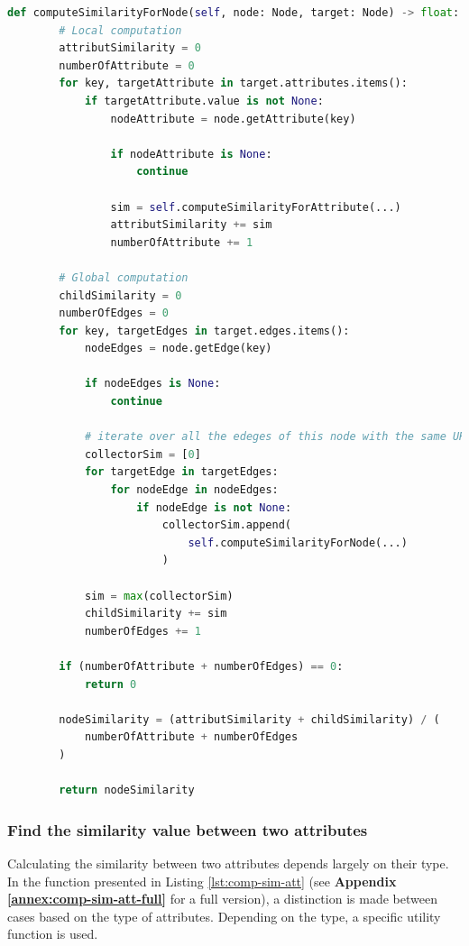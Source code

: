 \begin{lstlisting}[language=Python, caption=Function to find the similarity between one case and all the cases in the data-base, label={lst:comp-sim-node}]
def computeSimilarityForNode(self, node: Node, target: Node) -> float:
        # Local computation
        attributSimilarity = 0
        numberOfAttribute = 0
        for key, targetAttribute in target.attributes.items():
            if targetAttribute.value is not None:
                nodeAttribute = node.getAttribute(key)

                if nodeAttribute is None:
                    continue

                sim = self.computeSimilarityForAttribute(...)
                attributSimilarity += sim
                numberOfAttribute += 1

        # Global computation
        childSimilarity = 0
        numberOfEdges = 0
        for key, targetEdges in target.edges.items():
            nodeEdges = node.getEdge(key)

            if nodeEdges is None:
                continue

            # iterate over all the edeges of this node with the same URI
            collectorSim = [0]
            for targetEdge in targetEdges:
                for nodeEdge in nodeEdges:
                    if nodeEdge is not None:
                        collectorSim.append(
                            self.computeSimilarityForNode(...)
                        )

            sim = max(collectorSim)
            childSimilarity += sim
            numberOfEdges += 1

        if (numberOfAttribute + numberOfEdges) == 0:
            return 0

        nodeSimilarity = (attributSimilarity + childSimilarity) / (
            numberOfAttribute + numberOfEdges
        )

        return nodeSimilarity
\end{lstlisting}



\subsubsection{Find the similarity value between two attributes} 
Calculating the similarity between two attributes depends largely on their type. In the function presented in Listing \ref{lst:comp-sim-att} (see \textbf{Appendix \ref{annex:comp-sim-att-full}} for a full version), a distinction is made between cases based on the type of attributes. Depending on the type, a specific utility function is used.\\

